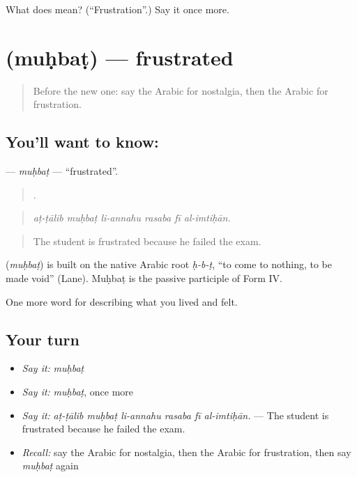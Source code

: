 \begin{tcolorbox}[breakable,colback=teal!4,colframe=teal!35!black,title={Before you move on}]
What does  mean? (\textquotedblleft{}Frustration\textquotedblright{}.) Say it once more.
\end{tcolorbox}
\section[\texorpdfstring{\ar{محبط} (muḥbaṭ)}{محبط (muḥbaṭ)}]{ (muḥbaṭ) — frustrated}

\label{lesson:AR-C494-muhbat}



\begin{quote}
Before the new one: say the Arabic for nostalgia, then the Arabic for frustration.
\end{quote}

\subsection*{You'll want to know: }
\textbf{} — \emph{muḥbaṭ} — \textquotedblleft{}frustrated\textquotedblright{}.

\begin{quote}
     .
\end{quote}

\begin{quote}
\emph{aṭ-ṭālib muḥbaṭ li-annahu rasaba fī al-imtiḥān.}
\end{quote}

\begin{quote}
The student is frustrated because he failed the exam.
\end{quote}

\begin{cousinweb}
\textbf{} (\emph{muḥbaṭ}) is built on the native Arabic root \emph{ḥ-b-ṭ}, \textquotedblleft{}to come to nothing, to be made void\textquotedblright{} (Lane). Muḥbaṭ is the passive participle of Form IV.
\end{cousinweb}

\begin{grammarlens}[title={What you've built}]
One more word for describing what you lived and felt.
\end{grammarlens}

\subsection*{Your turn}
\begin{itemize}
\raggedright
  \item \emph{Say it:} \emph{muḥbaṭ}
  \item \emph{Say it:} \emph{muḥbaṭ}, once more
  \item \emph{Say it:} \emph{aṭ-ṭālib muḥbaṭ li-annahu rasaba fī al-imtiḥān.} — The student is frustrated because he failed the exam.
  \item \emph{Recall:} say the Arabic for nostalgia, then the Arabic for frustration, then say \emph{muḥbaṭ} again
\end{itemize}

